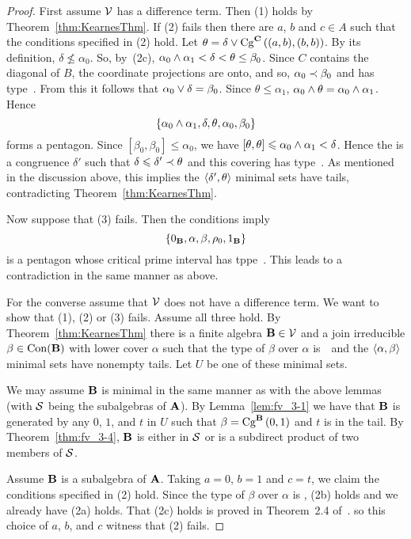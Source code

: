 \begin{proof}
First assume $\sV$ has a difference term.
Then (1) holds by Theorem~\ref{thm:KearnesThm}.
If (2) fails then there are $a$, $b$ and $c\in A$ such
that the conditions specified in (2) hold. 
Let $\theta = \delta \join \Cga {(a,b)}{(b,b)} C$. 
By its definition, $\delta \nleq \alpha_0$.
So, by~(2c), $\alpha_0\meet\alpha_1 < \delta < \theta \le \beta_0$.
Since $C$ contains the diagonal of $B$, the coordinate
projections are onto, and so, $\alpha_0 \cov \beta_0$ and has type~\atyp. 
From this it follows that $\alpha_0 \join \delta = \beta_0$.
Since $\theta \le \alpha_1$, $\alpha_0 \meet \theta = \alpha_0\meet\alpha_1$.
Hence
\[
\{\alpha_0\meet\alpha_1, \delta, \theta, \alpha_0, \beta_0 \}
\]
forms a pentagon.
Since $[\beta_0,\beta_0] \leq \alpha_0$, we have
$[\theta,\theta] \leq \alpha_0\meet\alpha_1 < \delta$.
Hence the is a congruence $\delta'$ such that 
$\delta\leq \delta' \cov \theta$ and this covering has
type~\atyp.
As mentioned in the discussion above, this implies the
$\la \delta',\theta\ra$ minimal sets have tails, contradicting
Theorem~\ref{thm:KearnesThm}.

Now suppose that (3) fails. Then the conditions imply
\[
\{0_{\alg B}, \alpha, \beta, \rho_0, 1_{\alg B} \}
\]
is a pentagon whose critical prime interval has tppe~\atyp. This 
leads to a contradiction in the same manner as above.

For the converse assume that $\sV$ does not have a difference 
term. 
We want to show that (1), (2) or (3) fails. Assume all three hold.
By Theorem~\ref{thm:KearnesThm} there is a finite 
algebra $\alg B \in \sV$ and a join irreducible 
$\beta \in \op{Con}(\alg B)$ with lower cover 
$\alpha$ such that the type of $\beta$ over $\alpha$ is~\atyp\
and the $\la\alpha,\beta\ra$ minimal sets have
nonempty tails. Let $U$ be one of these minimal sets.


We may assume $\alg B$ is minimal in the same manner as with the
above lemmas (with $\sS$ being the subalgebras of $\alg A$).
By Lemma~\ref{lem:fv_3-1} 
we have that $\alg B$ is generated by any $0$, $1$, and $t$ in
$U$ such
that $\beta = \Cga 01{B}$ and $t$ is in the tail. By 
Theorem~\ref{thm:fv_3-4}, $\alg B$ is either 
in $\sS$ or is a subdirect product of two members of $\sS$.

Assume $\alg B$ is a subalgebra of $\alg A$. Taking 
$a=0$, $b=1$ and $c=t$, we claim the conditions specified
in (2) hold. 
Since the type of $\beta$ over $\alpha$ is \atyp,
(2b) holds and we already have (2a) holds. 
That (2c) holds is proved in Theorem~2.4 of~\cite{KearnesKiss1999}.
so this choice of $a$, $b$, and $c$ witness that (2) fails.





\end{proof}
